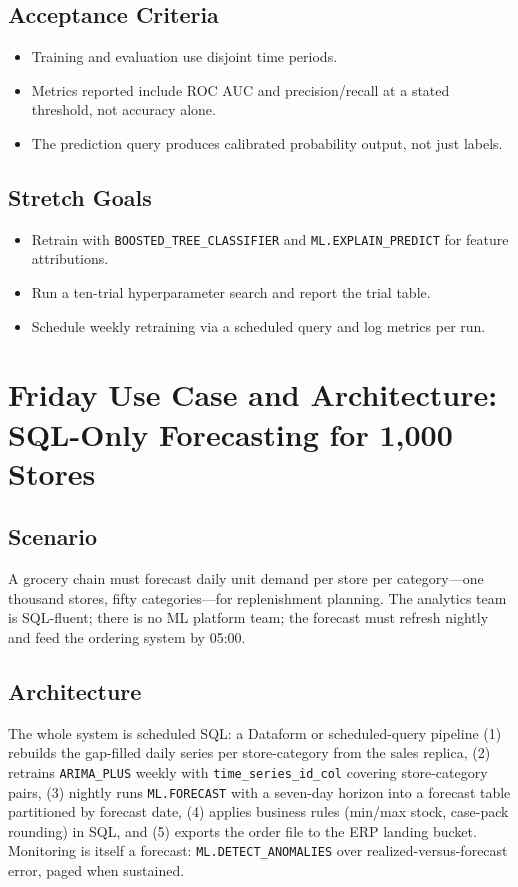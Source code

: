 \subsection*{Acceptance Criteria}
\begin{itemize}
    \item Training and evaluation use disjoint time periods.
    \item Metrics reported include ROC AUC and precision/recall at a stated threshold, not accuracy alone.
    \item The prediction query produces calibrated probability output, not just labels.
\end{itemize}

\subsection*{Stretch Goals}
\begin{itemize}
    \item Retrain with \texttt{BOOSTED\_TREE\_CLASSIFIER} and \texttt{ML.EXPLAIN\_PREDICT} for feature attributions.
    \item Run a ten-trial hyperparameter search and report the trial table.
    \item Schedule weekly retraining via a scheduled query and log metrics per run.
\end{itemize}

\section{Friday Use Case and Architecture: SQL-Only Forecasting for 1,000 Stores}

\subsection{Scenario}
A grocery chain must forecast daily unit demand per store per category---one thousand stores, fifty categories---for replenishment planning. The analytics team is SQL-fluent; there is no ML platform team; the forecast must refresh nightly and feed the ordering system by 05:00.

\subsection{Architecture}
The whole system is scheduled SQL: a Dataform or scheduled-query pipeline (1) rebuilds the gap-filled daily series per store-category from the sales replica, (2) retrains \texttt{ARIMA\_PLUS} weekly with \texttt{time\_series\_id\_col} covering store-category pairs, (3) nightly runs \texttt{ML.FORECAST} with a seven-day horizon into a forecast table partitioned by forecast date, (4) applies business rules (min/max stock, case-pack rounding) in SQL, and (5) exports the order file to the ERP landing bucket. Monitoring is itself a forecast: \texttt{ML.DETECT\_ANOMALIES} over realized-versus-forecast error, paged when sustained.

